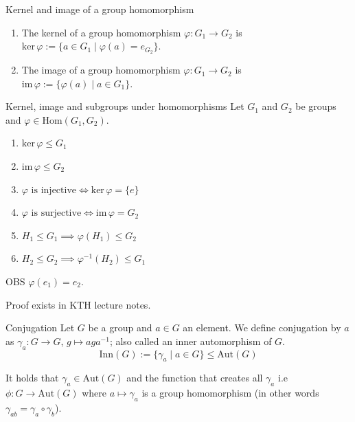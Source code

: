 \documentclass[a4paper]{article}
\begin{document}
\begin{defi}{Kernel and image of a group homomorphism}
\begin{enumerate}[label=(\alph*)]
    \item The kernel of a group homomorphism $\varphi : G_1 \to G_2$ is $\text{ker}\,\varphi := \{a \in G_1 \mid \varphi(a) = e_{G_2}\}$.
    \item The image of a group homomorphism $\varphi : G_1 \to G_2$ is $\text{im}\,\varphi := \{\varphi(a) \mid a \in G_1\}$.
\end{enumerate}
\end{defi}

\begin{ther}{Kernel, image and subgroups under homomorphisms}
Let $G_1$ and $G_2$ be groups and $\varphi \in \text{Hom}(G_1, G_2)$.
\begin{enumerate}[label=(\alph*)]
    \item $\text{ker}\,\varphi \le G_1$
    \item $\text{im}\,\varphi \le G_2$
    \item $\varphi \text{ is injective} \iff \text{ker}\,\varphi = \{e\}$
    \item $\varphi \text{ is surjective} \iff \text{im}\,\varphi = G_2$
    \item $H_1 \le G_1 \implies \varphi(H_1) \le G_2$
    \item $H_2 \le G_2 \implies \varphi^{-1}(H_2) \le G_1$
\end{enumerate}
\end{ther}
\begin{aha}
    OBS $\varphi(e_1)=e_2$. 
\end{aha}
\begin{add}
    Proof exists in KTH lecture notes.
\end{add}

\begin{defi}{Conjugation}
Let $G$ be a group and $a \in G$ an element. We define conjugation by $a$ as $\gamma_a : G \to G$, $g \mapsto aga^{-1}$; also called an inner automorphism of $G$. 
$$\text{Inn}(G) := \{\gamma_a \mid a \in G\} \le \text{Aut}(G)$$
\end{defi}

\begin{add}
It holds that $\gamma_a \in \text{Aut}(G)$ and the function that creates all $\gamma_a$ i.e $\phi: G \to \text{Aut}(G)$ where $a \mapsto \gamma_a$ is a group homomorphism (in other words $\gamma_{ab} = \gamma_a \circ \gamma_b$).
\end{add}
\end{document}
